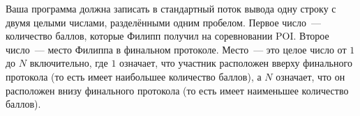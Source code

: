Ваша программа должна записать в стандартный поток вывода одну строку с двумя целыми числами, разделёнными одним пробелом. Первое число~--- количество баллов, которые Филипп получил на соревновании POI. Второе число~--- место Филиппа в финальном протоколе.
Место~--- это целое число от $1$ до $N$ включительно, где $1$ означает, что участник расположен вверху финального протокола (то есть имеет наибольшее количество баллов), а $N$ означает, что он расположен внизу финального протокола (то есть имеет наименьшее количество баллов).

